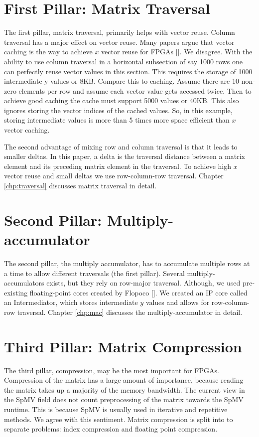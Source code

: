 \section{First Pillar: Matrix Traversal}
\par The first pillar, matrix traversal, primarily helps with vector reuse. Column traversal has a major effect on vector reuse. Many papers argue that vector caching is the way to achieve $x$ vector reuse for FPGAs [\cite{prelim:umuroglu, prelim:nagar1}]. We disagree. With the ability to use column traversal in a horizontal subsection of say 1000 rows one can perfectly reuse vector values in this section. This requires the storage of 1000 intermediate y values or 8KB. Compare this to caching. Assume there are 10 non-zero elements per row and assume each vector value gets accessed twice. Then to achieve good caching the cache must support 5000 values or 40KB. This also ignores storing the vector indices of the cached values. So, in this example, storing intermediate values is more than 5 times more space efficient than $x$ vector caching.
\par The second advantage of mixing row and column traversal is that it leads to smaller deltas. In this paper, a delta is the traversal distance between a matrix element and its preceding matrix element in the traversal. To achieve high $x$ vector reuse and small deltas we use row-column-row traversal. Chapter \ref{chp:traversal} discusses matrix traversal in detail.

\section{Second Pillar: Multiply-accumulator}

\par The second pillar, the multiply accumulator, has to accumulate multiple rows at a time to allow different traversals (the first pillar). Several multiply-accumulators exists, but they rely on row-major traversal. Although, we used pre-existing floating-point cores created by Flopoco [\cite{prelim:dedinechin}]. We created an IP core called an Intermediator, which stores intermediate $y$ values and allows for row-column-row traversal. Chapter \ref{chp:mac} discusses the multiply-accumulator in detail.

\section{Third Pillar: Matrix Compression}
\par The third pillar, compression, may be the most important for FPGAs. Compression of the matrix has a large amount of importance, because reading the matrix takes up a majority of the memory bandwidth. The current view in the SpMV field does not count preprocessing of the matrix towards the SpMV runtime. This is because SpMV is usually used in iterative and repetitive methods. We agree with this sentiment. Matrix compression is split into to separate problems: index compression and floating point compression.
